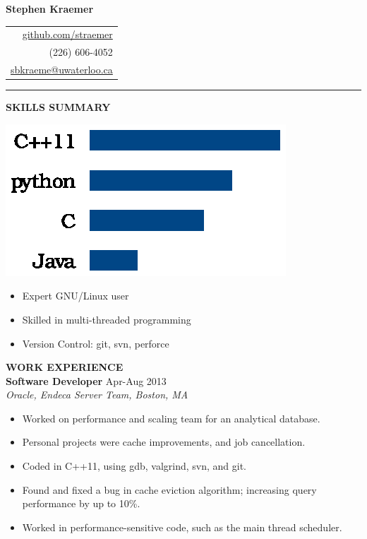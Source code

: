 \documentclass{letter}
\begin{document}
{\Huge\bf Stephen Kraemer} \hfill
\begin{tabular}{r}
\href{https://github.com/straemer}{github.com/straemer} \\
\hfill (226) 606-4052 \\
\hfill \href{mailto:sbkraeme@uwaterloo.ca}{sbkraeme@uwaterloo.ca}
\end{tabular}
\vskip 2pt
\hrule

{\large\bf SKILLS SUMMARY} \\
\begin{minipage}{0.35\textwidth}
\includegraphics{programming_languages.eps}
\end{minipage}
\begin{minipage}{0.65\textwidth}
\begin{itemize}
\item Expert GNU/Linux user
\item Skilled in multi-threaded programming
\item Version Control: git, svn, perforce
\end{itemize}
\end{minipage}


{\large\bf WORK EXPERIENCE} \\
{\bf Software Developer} \hfill Apr-Aug 2013 \\
{\sl Oracle, Endeca Server Team, Boston, MA}
\begin{itemize}
\item Worked on performance and scaling team for an analytical database.
\item Personal projects were cache improvements, and job cancellation.
\item Coded in C++11, using gdb, valgrind, svn, and git.
\item Found and fixed a bug in cache eviction algorithm; increasing query performance by up to 10\%.
\item Worked in performance-sensitive code, such as the main thread scheduler.
\end{itemize}
\end{document}
